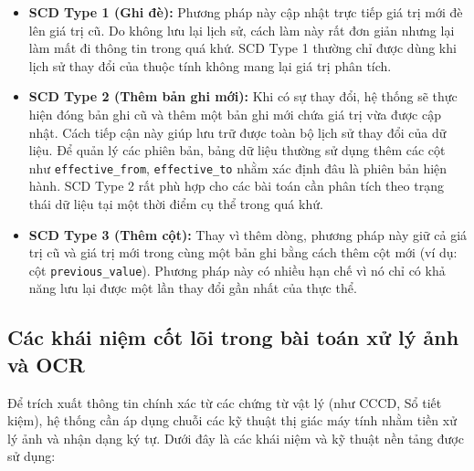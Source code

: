 \begin{itemize}
    \item \textbf{SCD Type 1 (Ghi đè):} Phương pháp này cập nhật trực tiếp giá trị mới đè lên giá trị cũ. Do không lưu lại lịch sử, cách làm này rất đơn giản nhưng lại làm mất đi thông tin trong quá khứ. SCD Type 1 thường chỉ được dùng khi lịch sử thay đổi của thuộc tính không mang lại giá trị phân tích.
    
    \item \textbf{SCD Type 2 (Thêm bản ghi mới):} Khi có sự thay đổi, hệ thống sẽ thực hiện đóng bản ghi cũ và thêm một bản ghi mới chứa giá trị vừa được cập nhật. Cách tiếp cận này giúp lưu trữ được toàn bộ lịch sử thay đổi của dữ liệu. Để quản lý các phiên bản, bảng dữ liệu thường sử dụng thêm các cột như \texttt{effective\_from}, \texttt{effective\_to} nhằm xác định đâu là phiên bản hiện hành. SCD Type 2 rất phù hợp cho các bài toán cần phân tích theo trạng thái dữ liệu tại một thời điểm cụ thể trong quá khứ.
    
    \item \textbf{SCD Type 3 (Thêm cột):} Thay vì thêm dòng, phương pháp này giữ cả giá trị cũ và giá trị mới trong cùng một bản ghi bằng cách thêm cột mới (ví dụ: cột \texttt{previous\_value}). Phương pháp này có nhiều hạn chế vì nó chỉ có khả năng lưu lại được một lần thay đổi gần nhất của thực thể.
\end{itemize}
\subsection{Các khái niệm cốt lõi trong bài toán xử lý ảnh và OCR}

Để trích xuất thông tin chính xác từ các chứng từ vật lý (như CCCD, Sổ tiết kiệm), hệ thống cần áp dụng chuỗi các kỹ thuật thị giác máy tính nhằm tiền xử lý ảnh và nhận dạng ký tự. Dưới đây là các khái niệm và kỹ thuật nền tảng được sử dụng:

